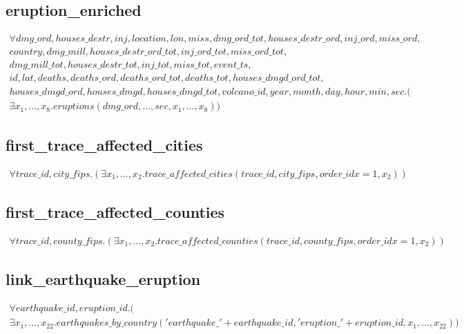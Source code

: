 \documentclass{article}
\begin{document}
\subsection{eruption\_enriched}

\begin{multline}
\forall dmg\_ord,  houses\_destr,  inj,  location,  lon,  miss,  dmg\_ord\_tot,  houses\_destr\_ord,  inj\_ord,  miss\_ord, \\  country,  dmg\_mill,  houses\_destr\_ord\_tot,  inj\_ord\_tot,  miss\_ord\_tot, \\ dmg\_mill\_tot,  houses\_destr\_tot,  inj\_tot,  miss\_tot,  event\_ts,\\  id,  lat,  deaths,  deaths\_ord,  deaths\_ord\_tot,  deaths\_tot,  houses\_dmgd\_ord\_tot,\\  houses\_dmgd\_ord,  houses\_dmgd,  houses\_dmgd\_tot,  volcano\_id,  year,  month,  day,  hour,  min,  sec.(\\
\exists x_1, ..., x_{8}. eruptions(dmg\_ord, ..., sec, x_1, ..., x_{8}))
\end{multline} 

\subsection{first\_trace\_affected\_cities}

\begin{multline}
\forall trace\_id, city\_fips.(
\exists x_1, ..., x_{2}. trace\_affected\_cities(trace\_id, city\_fips, order\_idx=1, x_{2}))
\end{multline} 

\subsection{first\_trace\_affected\_counties}

\begin{multline}
\forall trace\_id, county\_fips.(
\exists x_1, ..., x_{2}. trace\_affected\_counties(trace\_id, county\_fips, order\_idx=1, x_{2}))
\end{multline} 

\subsection{link\_earthquake\_eruption}

\begin{multline}
\forall earthquake\_id, eruption\_id.(\\
\exists x_1, ..., x_{22}. earthquakes\_by\_country('earthquake\_' + earthquake\_id,'eruption\_' +  eruption\_id, x_1, ..., x_{22}))
\end{multline} 
\end{document}
